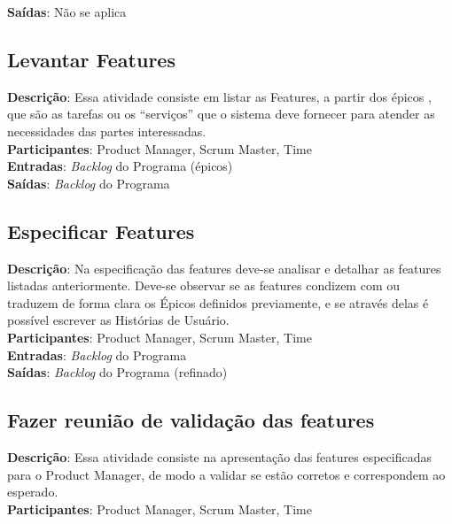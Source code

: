   \textbf{Saídas}:  Não se aplica\\

\subsection{Levantar Features}
\textbf{Descrição}: Essa atividade consiste em listar as Features, a partir dos épicos , 
que são as tarefas ou os “serviços” que o sistema deve fornecer para atender as necessidades das partes interessadas. \\

\textbf{Participantes}: Product Manager, Scrum Master, Time \\

\textbf{Entradas}: \textit{Backlog} do Programa (épicos) \\

\textbf{Saídas}:   \textit{Backlog} do Programa \\

\subsection{Especificar Features}
\textbf{Descrição}: Na especificação das features deve-se analisar e detalhar as features listadas anteriormente.
Deve-se observar se as features condizem com ou traduzem de forma clara os Épicos 
definidos previamente, e se através delas é possível escrever as Histórias de Usuário.\\

\textbf{Participantes}: Product Manager, Scrum Master, Time \\

\textbf{Entradas}: \textit{Backlog} do Programa\\

\textbf{Saídas}:   \textit{Backlog} do Programa (refinado)\\

\subsection{Fazer reunião de validação das features}
  \textbf{Descrição}: Essa atividade consiste na apresentação das features especificadas para o Product Manager, de modo a validar se 
  estão corretos e correspondem ao esperado.  \\
  
  \textbf{Participantes}: Product Manager, Scrum Master, Time \\
  
